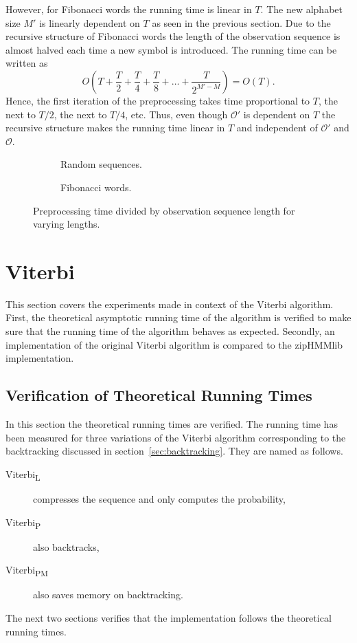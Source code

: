 However, for Fibonacci words the running time is linear in $T$. The new
alphabet size $M'$ is linearly dependent on $T$ as seen in the
previous section. Due to the recursive structure of Fibonacci words the length
of the observation sequence is almost halved each time a new symbol is
introduced. The running time can be written as
\begin{equation*}
  O(T + \frac{T}{2} + \frac{T}{4} + \frac{T}{8} + \dots + \frac{T}{2^{M' - M}}) = O(T).
\end{equation*}
Hence, the first iteration of the preprocessing takes time proportional to $T$,
the next to $T/2$, the next to $T/4$, etc. Thus, even though $\mathcal{O'}$
is dependent on $T$ the recursive structure makes the running time linear in
$T$ and independent of $\mathcal{O'}$ and $\mathcal{O}$.

\begin{figure}
  \centering
  \begin{subfigure}[b]{0.5\textwidth}
    \centering 
    \caption{Random sequences.}
  \end{subfigure}\hspace{-5mm}%
  \begin{subfigure}[b]{0.5\textwidth}
    \centering 
    \caption{Fibonacci words.}
  \end{subfigure}
  \caption{Preprocessing time divided by observation sequence length for
    varying lengths.}
  \label{fig:pre_viterbi_T}
\end{figure}

\section{Viterbi}

This section covers the experiments made in context of the Viterbi algorithm.
First, the theoretical asymptotic running time of the algorithm is verified to
make sure that the running time of the algorithm behaves as expected. Secondly,
an implementation of the original Viterbi algorithm is compared to the
zipHMMlib implementation.

\subsection{Verification of Theoretical Running Times}
\label{sec:theor-runn-times}

In this section the theoretical running times are verified. The running time
has been measured for three variations of the Viterbi algorithm corresponding
to the backtracking discussed in section~\ref{sec:backtracking}. They are named
as follows.
\begin{description}
\item[Viterbi\textsubscript{L}] compresses the sequence and only computes the
  probability,
\item[Viterbi\textsubscript{P}] also backtracks,
\item[Viterbi\textsubscript{PM}] also saves memory on backtracking.
\end{description}
The next two sections verifies that the implementation follows the theoretical
running times.

